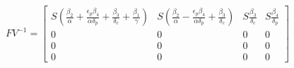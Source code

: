 \documentclass[preview]{standalone}
\begin{document}
\begin{align*}
FV^{-1} = \begin{bmatrix} S ( \frac{\beta_2}{\alpha} + \frac{\epsilon_p \beta_4}{\alpha \delta_p} + \frac{\beta_3}{\delta_c} + \frac{\beta_1}{\gamma} ) & S (\frac{\beta_2}{\alpha} - \frac{\epsilon_p \beta_4}{\alpha \delta_p} + \frac{\beta_3}{\delta_c}) & S \frac{\beta_3}{\delta_c} & S \frac{\beta_4}{\delta_p} \\ 0 & 0 & 0 & 0 \\ 0 & 0 & 0 & 0 \\ 0 & 0 & 0 & 0 \end{bmatrix}
\end{align*}
\end{document}
